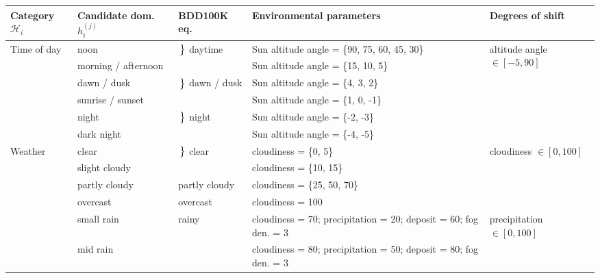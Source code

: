 \begin{table*}[t]
\footnotesize
\setlength{\tabcolsep}{3pt}
\begin{tabular}{@{}lllll@{}}
\toprule
\textbf{Category} $\mathcal{H}_i$ &
  \textbf{Candidate dom.} $h_i^{(j)}$ &
  \textbf{BDD100K eq.} &
  \textbf{Environmental parameters } &
  \textbf{Degrees of shift} \\ \midrule
\multirow{6}{*}{Time of day} &
  {noon} &
  \multirow{2}{*}[1pt]{$\left.\rule{0cm}{0.3cm}\right\}$ daytime} &
  Sun altitude angle = \{90, 75, 60, 45, 30\} &
  \multirow{6}{*}{altitude angle $\in [-5, 90]$} \\
 & morning / afternoon &                                & Sun altitude angle = \{15, 10, 5\}                                    &  \\ 
 & dawn / dusk         & \multirow{2}{*}[1pt]{$\left.\rule{0cm}{0.3cm}\right\}$ dawn / dusk} & Sun altitude angle = \{4, 3, 2\}                                      &  \\
 & sunrise / sunset    &                                & Sun altitude angle = \{1, 0, -1\}                                     &  \\ 
 & night               & \multirow{2}{*}[1pt]{$\left.\rule{0cm}{0.3cm}\right\}$ night}         & Sun altitude angle = \{-2, -3\}                                       &  \\
 & {dark night}          &                                & Sun altitude angle = \{-4, -5\}                                       &  \\ \midrule
\multirow{10}{*}{Weather} &
  {clear} &
  \multirow{2}{*}[1pt]{$\left.\rule{0cm}{0.3cm}\right\}$ clear}  &
  cloudiness = \{0, 5\} &
  \multirow{4}{*}{cloudiness $\in [0, 100]$} \\
 & slight cloudy       & 
& cloudiness = \{10, 15\}        
&  \\
 & partly cloudy              &     partly cloudy                           & cloudiness = \{25, 50, 70\}                                               &  \\
 & {overcast}            & overcast                       & cloudiness = 100                                                      &  \\ \cmidrule(rr){2-5} 
 &
  {small rain} &
  \multirow{3}{*}{rainy} &
  cloudiness = 70; precipitation = 20; deposit = 60; fog den. = 3 &
  \multirow{3}{*}{precipitation $\in [0, 100]$} \\
 & mid rain            &                                & cloudiness = 80; precipitation = 50; deposit = 80; fog den. = 3    &  \\

\end{tabular}
\end{table*}
